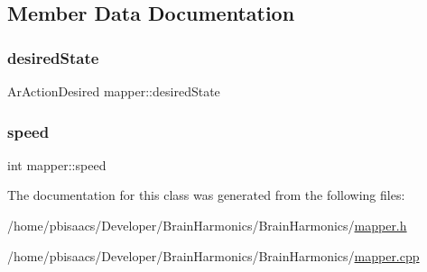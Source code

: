 \subsection{Member Data Documentation}
\mbox{\label{classmapper_ad12cf719b7ef6c4399ca718cdc9f270d}} 
\subsubsection{\texorpdfstring{desired\+State}{desiredState}}
{\footnotesize\ttfamily Ar\+Action\+Desired mapper\+::desired\+State}

\mbox{\label{classmapper_a2764f9fead6392132485f3545c18b629}} 
\subsubsection{\texorpdfstring{speed}{speed}}
{\footnotesize\ttfamily int mapper\+::speed\hspace{0.3cm}{\ttfamily [protected]}}



The documentation for this class was generated from the following files\+:\begin{DoxyCompactItemize}
\item 
/home/pbisaacs/\+Developer/\+Brain\+Harmonics/\+Brain\+Harmonics/\mbox{\hyperlink{mapper_8h}{mapper.\+h}}\item 
/home/pbisaacs/\+Developer/\+Brain\+Harmonics/\+Brain\+Harmonics/\mbox{\hyperlink{mapper_8cpp}{mapper.\+cpp}}\end{DoxyCompactItemize}
